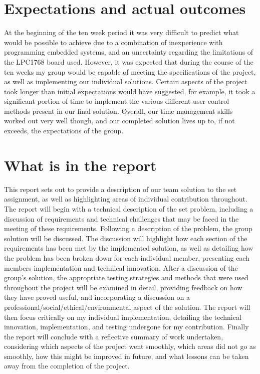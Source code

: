 \section{Expectations and actual outcomes}
At the beginning of the ten week period it was very difficult to predict what 
would be possible to achieve due to a combination of  inexperience with 
programming embedded systems, and an uncertainty regarding the limitations 
of the LPC1768 board used. However, it was expected that during the 
course of the ten weeks my group would be capable of meeting the specifications
of the project, as well as implementing our individual solutions. Certain 
aspects of the project took longer than initial expectations would have 
suggested, for example, it took a significant portion of time to implement the 
various different user control methods present in our final solution. Overall, 
our time management skills worked out very well though, and our completed 
solution lives up to, if not exceeds, the expectations of the group. 

\section{What is in the report}
This report sets out to provide a description of our team solution to the set 
assignment, as well as highlighting areas of individual contribution throughout.
The report will begin with a technical description of the set problem, 
including a discussion of requirements and technical challenges that may be 
faced in the meeting of these requirements. 
Following a description of the problem, the group solution will be discussed. 
The discussion will highlight how each section of the requirements has been met 
by the implemented solution, as well as detailing how the problem has been broken 
down for each individual member, presenting each members implementation and 
technical innovation. 
After a discussion of the group's solution, the appropriate testing strategies 
and methods that were used throughout the project will be examined in detail, 
providing feedback on how they have proved useful, and incorporating a 
discussion on a professional/social/ethical/environmental aspect of the solution.
The report will then focus critically on my individual implementation, 
detailing the technical innovation, implementation, and testing undergone for my 
contribution. 
Finally the report will conclude with a reflective summary of work 
undertaken, considering which aspects of the project went smoothly, which areas
did not go as smoothly, how this might be improved in future, and what lessons 
can be taken away from the completion of the project. 
